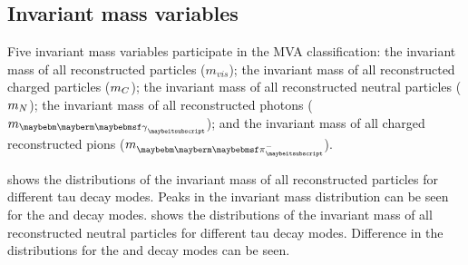 
\subsection{Invariant mass variables}

Five invariant mass variables participate in the MVA classification: the invariant mass of all reconstructed particles ($m_{vis}$); the invariant mass of all reconstructed charged particles ($m_{C}$); the invariant mass of all reconstructed neutral particles ($m_{N}$); the invariant mass of all reconstructed photons ($m_{\Pgg}$); and the invariant mass of all charged reconstructed pions ($m_{\Pgpm}$). 

 shows the distributions of the invariant mass of all reconstructed particles  for different tau decay modes. Peaks in the invariant mass distribution can be seen for the \Prho and \Pai decay modes.  shows the distributions of the invariant mass of all reconstructed neutral particles  for different tau decay modes. Difference in the distributions for  the \Prho and \Pai decay modes can be seen.






